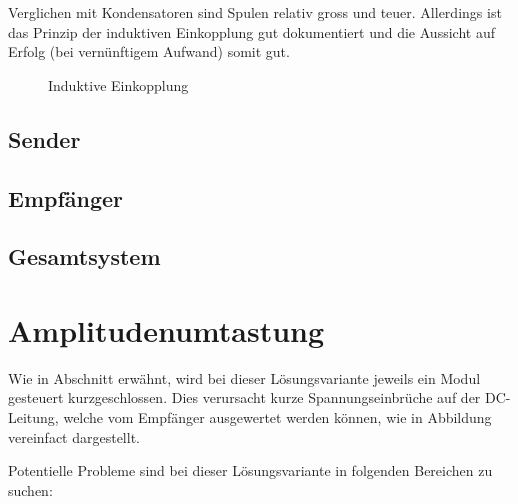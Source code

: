 Verglichen mit  Kondensatoren sind Spulen relativ  gross und teuer. Allerdings
ist das Prinzip  der induktiven Einkopplung gut dokumentiert  und die Aussicht
auf Erfolg (bei vern\"unftigem Aufwand) somit gut.

\begin{figure}[h!tb]
    \centering
    
    \caption{Induktive Einkopplung}
    \label{fig:circ:coupling:inductive}
\end{figure}

\subsection{Sender}
\label{sec:simu:fsk:inductive:transmitter}

\subsection{Empf\"anger}
\label{sec:simu:fsk:inductive:receiver}

\subsection{Gesamtsystem}
\label{sec:simu:fsk:inductive:inductive}


\section{Amplitudenumtastung}
\label{sec:simu:ask}

Wie in Abschnitt  erw\"ahnt, wird bei dieser L\"osungsvariante
jeweils   ein   Modul   gesteuert   kurzgeschlossen. Dies   verursacht   kurze
Spannungseinbr\"uche auf  der DC-Leitung,  welche vom  Empf\"anger ausgewertet
werden k\"onnen, wie in Abbildung vereinfact dargestellt.

Potentielle Probleme sind bei  dieser L\"osungsvariante in folgenden Bereichen
zu suchen:

